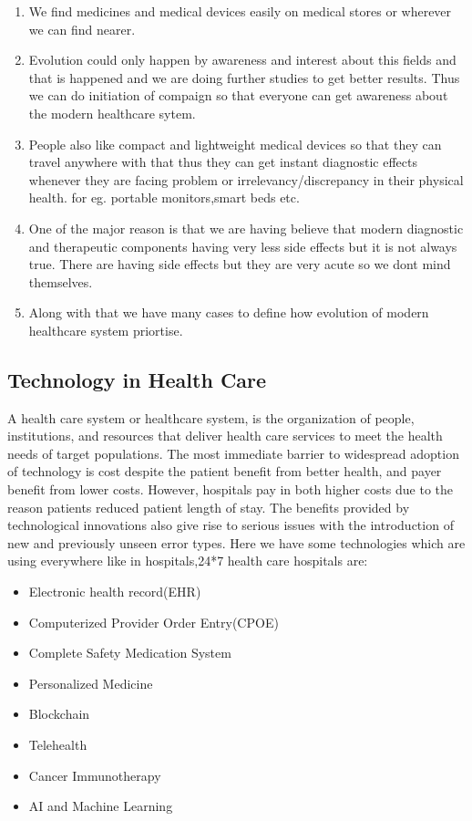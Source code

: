 \documentclass[12pts]{article}
\begin{document}
\begin{enumerate}


\item  We find medicines and medical devices easily on medical stores or wherever we can find nearer.\\
\item Evolution could only happen by awareness and interest about this fields and that is happened and we are doing further studies to get better results. Thus we can do initiation of compaign so that everyone can get awareness about the modern healthcare sytem.\\
\item People also like compact and lightweight medical devices so that they can travel anywhere with that thus they can get instant diagnostic effects whenever they are facing problem or irrelevancy/discrepancy in their physical health. for eg. portable monitors,smart beds etc.\\

\item One of the major reason is that we are having believe that modern diagnostic and therapeutic components having very less side effects but it is not always true. There are having side effects but they are very acute so we dont mind themselves.\\
\item Along with that we have many cases to define how evolution of modern healthcare system priortise.\\
\end{enumerate}
\subsection*{Technology in Health Care}
A health care system or healthcare system, is the organization of people, institutions, and resources that deliver health care services to meet the health needs of target populations.
The most immediate barrier to widespread adoption of technology is cost despite the patient benefit from better health, and payer benefit from lower costs. However, hospitals pay in both higher costs due to the reason patients reduced patient length of stay. The benefits provided by technological innovations also give rise to serious issues with the introduction of new and previously unseen error types. Here we have some technologies which are using everywhere like in hospitals,24*7 health care hospitals are:\\
\begin{itemize}
\item Electronic health record(EHR)
\item Computerized Provider Order Entry(CPOE)
\item Complete Safety Medication System
\item Personalized Medicine
\item Blockchain
\item Telehealth
\item Cancer Immunotherapy
\item AI and Machine Learning
\end{itemize}
\end{document}
